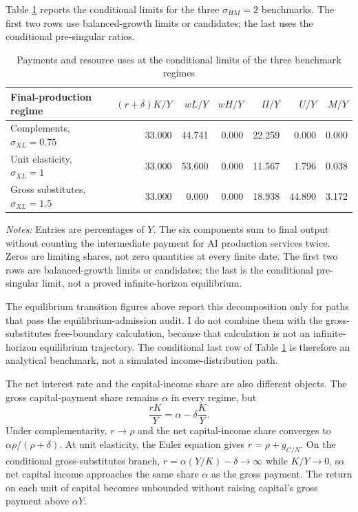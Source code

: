Table \ref{tab:axm-distributional-synthesis} reports the conditional limits for
the three \(\sigma_{HM}=2\) benchmarks. The first two rows use balanced-growth
limits or candidates; the last uses the conditional pre-singular ratios.

\begin{table}[H]
\centering
\footnotesize
\setlength{\tabcolsep}{3.5pt}
\caption{Payments and resource uses at the conditional limits of the three benchmark regimes}
\label{tab:axm-distributional-synthesis}
\begin{tabular}{lrrrrrr}
\toprule
Final-production regime & \((r+\delta)K/Y\) & \(wL/Y\) & \(wH/Y\) & \(\Pi/Y\) & \(U/Y\) & \(M/Y\)\\
\midrule
Complements, \(\sigma_{XL}=0.75\) & 33.000 & 44.741 & 0.000 & 22.259 & 0.000 & 0.000\\
Unit elasticity, \(\sigma_{XL}=1\) & 33.000 & 53.600 & 0.000 & 11.567 & 1.796 & 0.038\\
Gross substitutes, \(\sigma_{XL}=1.5\) & 33.000 & 0.000 & 0.000 & 18.938 & 44.890 & 3.172\\
\bottomrule
\end{tabular}

\medskip
\parbox{0.95\textwidth}{\footnotesize \emph{Notes:} Entries are percentages of
\(Y\). The six components sum to final output without counting the intermediate
payment for AI production services twice. Zeros are limiting shares, not zero quantities at every
finite date. The first two rows are balanced-growth limits or candidates; the
last is the conditional pre-singular limit, not a proved infinite-horizon
equilibrium.}
\end{table}

The equilibrium transition figures above report this decomposition only for
paths that pass the equilibrium-admission audit. I do not combine them with the
gross-substitutes free-boundary calculation, because that calculation is not an
infinite-horizon equilibrium trajectory. The conditional last row of Table
\ref{tab:axm-distributional-synthesis} is therefore an analytical benchmark,
not a simulated income-distribution path.

The net interest rate and the capital-income share are also different objects.
The gross capital-payment share remains \(\alpha\) in every regime, but
\begin{equation}
 \frac{rK}{Y}=\alpha-\delta\frac{K}{Y}.
 \label{eq:axm-net-capital-share}
\end{equation}
Under complementarity, \(r\to\rho\) and the net capital-income share converges
to \(\alpha\rho/(\rho+\delta)\). At unit elasticity, the Euler equation gives
\(r=\rho+g_{C/N}\). On the conditional gross-substitutes branch,
\(r=\alpha(Y/K)-\delta\to\infty\) while \(K/Y\to0\), so net capital income
approaches the same share \(\alpha\) as the gross payment. The return on each
unit of capital becomes unbounded without raising capital's gross payment above
\(\alpha Y\).

